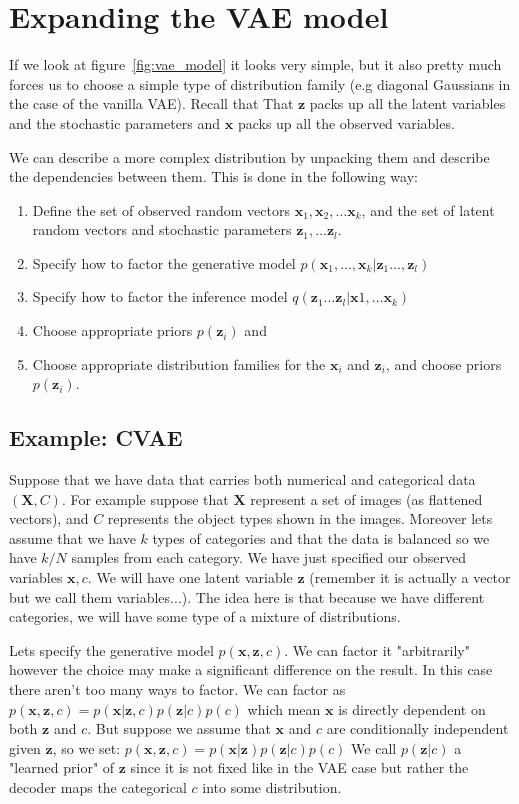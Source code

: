 \documentclass[11pt, a4paper]{report}
\theoremstyle{plain}
\theoremstyle{definition}
\theoremstyle{remark}
\newcommand{\X}{\mathbf{X}}
\newcommand{\x}{\mathbf{x}}
\newcommand{\z}{\mathbf{z}}
\begin{document}
\section{Expanding the VAE model}
If we look at figure~\ref{fig:vae_model} it looks very simple, but it also
pretty much forces us to choose a simple type of distribution family (e.g
diagonal Gaussians in the case of the vanilla VAE).
Recall that That $\z$ packs up all the latent variables and the stochastic
parameters and $\x$ packs up all the observed variables.

We can describe a more complex distribution by unpacking them and describe the
dependencies between them.
This is done in the following way:
\label{VAE-specs}
\begin{enumerate}
\item{} Define the set of observed random vectors $\x_1, \x_2, \dots \x_k$, and 
the set of latent random vectors and stochastic parameters $\z_1, \dots \z_l$.
\item{} Specify how to factor the generative model $p(\x_1,\dots, \x_k| \z_1
\dots , \z_l)$
\item{} Specify how to factor the inference model $q(\z_1 \dots \z_l | \x1,
\dots \x_k)$
\item{} Choose appropriate priors $p(\z_i)$ and
\item{} Choose appropriate distribution families for the $\x_i$ and $\z_i$,
and choose priors $p(\z_i)$.
\end{enumerate}

\subsection{Example: CVAE}
Suppose that we have data that carries both numerical and categorical data $(\X,
C)$.
For example suppose that $\X$ represent a set of images (as flattened vectors),
and $C$ represents the object types shown in the images.
Moreover lets assume that we have $k$ types of categories and that the data is
balanced so we have $k/N$ samples from each category.
We have just specified our observed variables $\x, c$.
We will have one latent variable $\z$ (remember it is actually a vector but we
call them variables...).
The idea here is that because we have different categories, we will have some
type of a mixture of distributions.

Lets specify the generative model $p(\x, \z, c)$. 
We can factor it "arbitrarily" however the choice may make a significant
difference on
the result. In this case there aren't too many
ways to factor.
We can factor as $p(\x, \z, c) = p(\x | \z, c)p(\z | c)p(c)$ which mean $\x$ is
directly dependent on both $\z$ and $c$.
But suppose we assume that 
$\x$ and $c$ are conditionally independent given $\z$, so we 
set: $p(\x, \z, c) = p(\x | \z)p(\z | c)p(c)$
We call $p(\z | c)$ a "learned prior" of $\z$ since it is not fixed like in the
VAE case but rather the decoder maps the categorical $c$ into some distribution.
\end{document}
